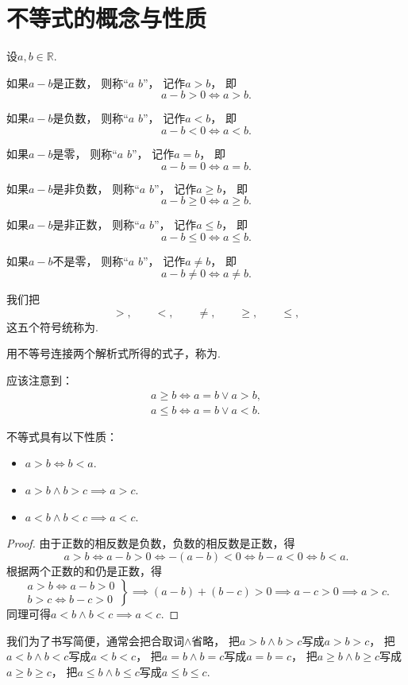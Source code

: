\section{不等式的概念与性质}
\begin{definition}
设\(a,b\in\mathbb{R}\).

如果\(a-b\)是正数，
则称“\(a\)  \(b\)”，
记作\(a>b\)，
即\[
	a-b>0
	\iff
	a>b.
\]

如果\(a-b\)是负数，
则称“\(a\)  \(b\)”，
记作\(a<b\)，
即\[
	a-b<0
	\iff
	a<b.
\]

如果\(a-b\)是零，
则称“\(a\)  \(b\)”，
记作\(a=b\)，
即\[
	a-b=0
	\iff
	a=b.
\]

如果\(a-b\)是非负数，
则称“\(a\)  \(b\)”，
记作\(a \geq b\)，
即\[
	a-b\geq0
	\iff
	a \geq b.
\]

如果\(a-b\)是非正数，
则称“\(a\)  \(b\)”，
记作\(a \leq b\)，
即\[
	a-b\leq0
	\iff
	a \leq b.
\]

如果\(a-b\)不是零，
则称“\(a\)  \(b\)”，
记作\(a \neq b\)，
即\[
	a-b\neq0
	\iff
	a \neq b.
\]

我们把\[
	>, \qquad
	<, \qquad
	\neq, \qquad
	\geq, \qquad
	\leq,
\]这五个符号统称为.

用不等号连接两个解析式所得的式子，称为.
\end{definition}
应该注意到：\begin{gather*}
	a \geq b \iff a = b \lor a > b, \\
	a \leq b \iff a = b \lor a < b.
\end{gather*}

\begin{property}\label{theorem:不等式.不等式的对称性和传递性}
不等式具有以下性质：\begin{itemize}
	\item \(a>b \iff b<a\).
	\item \(a>b \land b>c \implies a>c\).
	\item \(a<b \land b<c \implies a<c\).
\end{itemize}
\begin{proof}
由于正数的相反数是负数，负数的相反数是正数，得\[
	a > b \iff a-b > 0 \iff -(a-b) < 0 \iff b-a < 0 \iff b < a.
\]
根据两个正数的和仍是正数，得\[
	\left. \begin{array}{c}
		a > b \iff a-b > 0 \\
		b > c \iff b-c > 0
	\end{array} \right\}
	\implies (a-b)+(b-c) > 0
	\implies a-c > 0
	\implies a > c.
\]
同理可得\(a<b \land b<c \implies a<c\).
\end{proof}
\end{property}
我们为了书写简便，通常会把合取词\(\land\)省略，
把\(a>b \land b>c\)写成\(a>b>c\)，
把\(a<b \land b<c\)写成\(a<b<c\)，
把\(a=b \land b=c\)写成\(a=b=c\)，
把\(a \geq b \land b \geq c\)写成\(a \geq b \geq c\)，
把\(a \leq b \land b \leq c\)写成\(a \leq b \leq c\).

